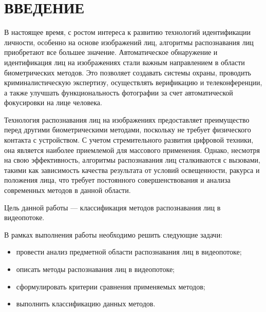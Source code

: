 \chapter*{ВВЕДЕНИЕ}

В настоящее время, с ростом интереса к развитию технологий идентификации 
личности, особенно на основе изображений лиц, алгоритмы распознавания лиц 
приобретают все большее значение. Автоматическое обнаружение и идентификация 
лиц на изображениях стали важным направлением в области биометрических методов. 
Это позволяет создавать системы охраны, проводить криминалистическую экспертизу, 
осуществлять верификацию и телеконференции, а также улучшать функциональность фотографии 
за счет автоматической фокусировки на лице человека.

Технология распознавания лиц на изображениях предоставляет преимущество 
перед другими биометрическими методами, поскольку не требует физического 
контакта с устройством. С учетом стремительного развития цифровой техники, 
она является наиболее приемлемой для массового применения. Однако, 
несмотря на свою эффективность, алгоритмы распознавания лиц сталкиваются 
с вызовами, такими как зависимость качества результата от условий 
освещенности, ракурса и положения лица, что требует постоянного 
совершенствования и анализа современных методов в данной области.

Цель данной работы --- классификация методов распознавания лиц в 
видеопотоке.

В рамках выполнения работы необходимо решить следующие задачи:

\begin{itemize}[label=---]
  \item провести анализ предметной области распознавания лиц в видеопотоке;
  \item описать методы распознавания лиц в видеопотоке;
  \item сформулировать критерии сравнения применяемых методов;
  \item выполнить классификацию данных методов.
\end{itemize}
